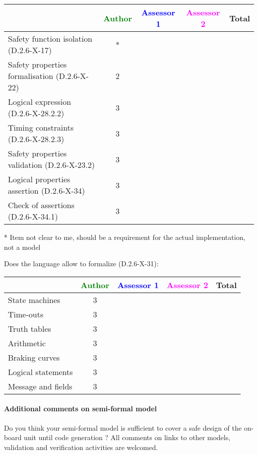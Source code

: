 \begin{tabular}{|l | c | c | c | c|}
\hline
& \textcolor{green}{Author} & \textcolor{blue}{Assessor 1} & \textcolor{magenta}{Assessor 2} & Total \\
\hline
Safety function isolation (D.2.6-X-17) &* & & & \\
\hline
Safety properties formalisation (D.2.6-X-22) &2 & & & \\
\hline
Logical expression (D.2.6-X-28.2.2) &3 & & & \\
\hline
Timing constraints (D.2.6-X-28.2.3) &3 & & & \\
\hline
Safety properties validation (D.2.6-X-23.2) &3 & & & \\
\hline
Logical properties assertion (D.2.6-X-34) &3 & & & \\
\hline
Check of assertions (D.2.6-X-34.1) &3 & & & \\
\hline
\end{tabular}

\begin{author_comment}
* Item not clear to me, should be a requirement for the actual implementation, not a model
\end{author_comment}

Does the language allow to formalize (D.2.6-X-31):

\begin{tabular}{|l | c | c | c | c|}
\hline
& \textcolor{green}{Author} & \textcolor{blue}{Assessor 1} & \textcolor{magenta}{Assessor 2} & Total \\
\hline
State machines &3 & & & \\
\hline
Time-outs &3 & & & \\
\hline
Truth tables &3 & & & \\
\hline
Arithmetic &3 & & & \\
\hline
Braking curves &3 & & & \\
\hline
Logical statements &3 & & & \\
\hline
Message and fields &3 & & & \\
\hline
\end{tabular}

\paragraph{Additional comments on semi-formal model} Do you think your semi-formal model is sufficient to cover a safe design of the on-board unit until code generation ?
All comments on links to other models, validation and verification activities are welcomed.

